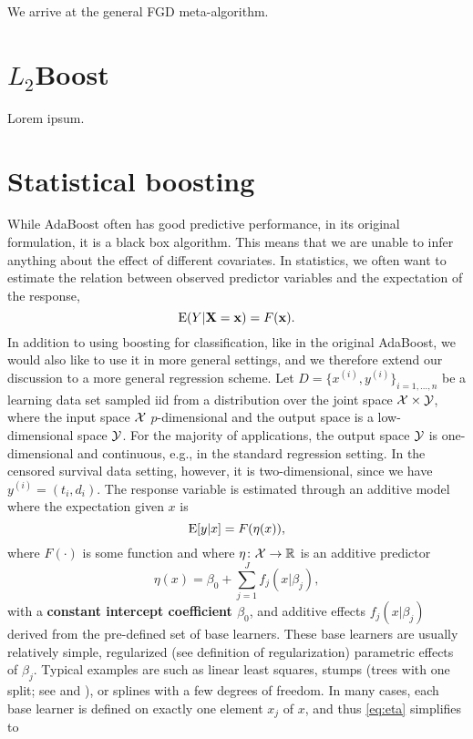 We arrive at the general FGD meta-algorithm.

\section{$L_2$Boost}
Lorem ipsum.

\section{Statistical boosting}
While AdaBoost often has good predictive performance, in its original formulation, it is a black box algorithm. This means that we are unable to infer anything about the effect of different covariates. In statistics, we often want to estimate the relation between observed predictor variables and the expectation of the response,
\begin{equation}\label{eq:exp-f}
    \operatorname{E}(Y|\mathbf{X}=\mathbf{x})=F(\mathbf{x}).
\end{equation}
In addition to using boosting for classification, like in the original AdaBoost, we would also like to use it in more general settings, and we therefore extend our discussion to a more general regression scheme. Let $D=\{x^{(i)},y^{(i)}\}_{i=1,\ldots,n}$ be a learning data set sampled iid from a distribution over the joint space $\mathcal{X}\times\mathcal{Y}$, where the input space $\mathcal{X}$ $p$-dimensional and the output space is a low-dimensional space $\mathcal{Y}$. For the majority of applications, the output space $\mathcal{Y}$ is one-dimensional and continuous, e.g., in the standard regression setting. In the censored survival data setting, however, it is two-dimensional, since we have $y^{(i)}=(t_i,d_i)$. The response variable is estimated through an additive model where the expectation given $x$ is 
\begin{equation}
    \operatorname{E}[y|x]=F(\eta(x)),
\end{equation}
where $F(\cdot)$ is some function and where $\eta\colon\mathcal{X}\to\mathbb{R}$ is an additive predictor
\begin{equation}\label{eq:eta}
    \eta(x)=\beta_0+\sum_{j=1}^Jf_j(x|\beta_j),
\end{equation}
with a \textbf{constant intercept coefficient $\beta_0$}, and additive effects $f_j(x|\beta_j)$ derived from the pre-defined set of base learners.
These base learners are usually relatively simple, regularized (see definition of regularization) parametric effects of $\beta_j$. Typical examples are such as linear least squares, stumps (trees with one split; see \citet{buhlmann2007} and \citet{ESL}), or splines with a few degrees of freedom. In many cases, each base learner is defined on exactly one element $x_j$ of $x$, and thus \eqref{eq:eta} simplifies to
